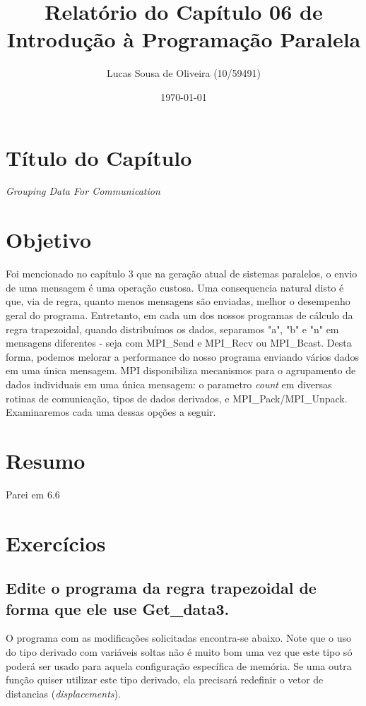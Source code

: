 \documentclass[11pt,a4paper,onecolumn]{article}
\title{Relatório do Capítulo 06 de\\Introdução à Programação Paralela}
\author{Lucas Sousa de Oliveira (10/59491)}
\date{\today}
\begin{document}
\maketitle

\section{Título do Capítulo}
\textit{Grouping Data For Communication}

\section{Objetivo}
Foi mencionado no capítulo 3 que na geração atual de sistemas paralelos, o envio de uma mensagem é uma operação custosa.
Uma consequencia natural disto é que, via de regra, quanto menos mensagens são enviadas, melhor o desempenho geral do programa.
Entretanto, em cada um dos nossos programas de cálculo da regra trapezoidal, quando distribuímos os dados, separamos "a", "b" e "n" em mensagens diferentes - seja com MPI\_Send e MPI\_Recv ou MPI\_Bcast.
Desta forma, podemos melorar a performance do nosso programa enviando vários dados em uma única mensagem.
MPI disponibiliza mecanismos para o agrupamento de dados individuais em uma única mensagem: o parametro \textit{count} em diversas rotinas de comunicação, tipos de dados derivados, e MPI\_Pack/MPI\_Unpack.
Examinaremos cada uma dessas opções a seguir.

\section{Resumo}
\label{sec:resumo}

Parei em 6.6

\section{Exercícios}
\subsection{Edite o programa da regra trapezoidal de forma que ele use Get\_data3.}
O programa com as modificações solicitadas encontra-se abaixo.
Note que o uso do tipo derivado com variáveis soltas não é muito bom uma vez que este tipo só poderá ser usado para aquela configuração específica de memória.
Se uma outra função quiser utilizar este tipo derivado, ela precisará redefinir o vetor de distancias (\textit{displacements}).

\end{document}

